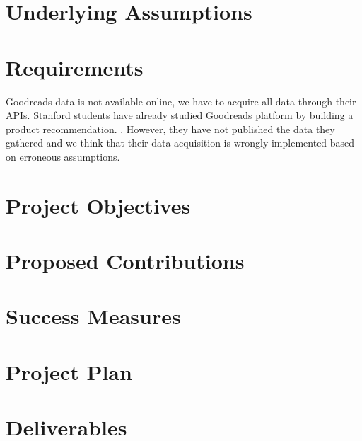 \documentclass[11pt]{article}
\begin{document}
\section{Underlying Assumptions}
\section{Requirements}

Goodreads data is not available online, we have to acquire all data through their APIs. Stanford students have already studied Goodreads platform by building a product recommendation. \cite{stanford:goodreads}. However, they have not published the data they gathered and we think that their data acquisition is wrongly implemented based on erroneous assumptions.



\section{Project Objectives}
\section{Proposed Contributions}
\section{Success Measures}
\section{Project Plan}
\section{Deliverables}


    
    
\end{document}
